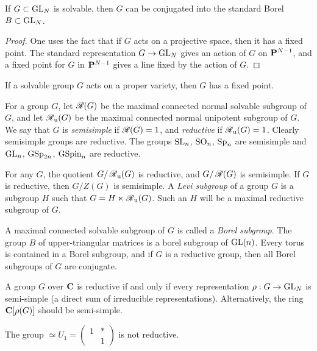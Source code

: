 \begin{theo}
If $G\subset \operatorname{GL}_N$ is solvable, then $G$ can be conjugated 
into the standard Borel $B\subset \operatorname{GL}_N$. 
\end{theo}
\begin{proof}
One uses the fact that if $G$ acts on a projective space, then it has a fixed 
point. The standard representation $G\to \operatorname{GL}_N$ gives an action of 
$G$ on $\mathbf{P}^{N-1}$, and a fixed point for $G$ in $\mathbf{P}^{N-1}$ gives a line fixed 
by the action of $G$. 
\end{proof}

\begin{theo}[Borel]
If a solvable group $G$ acts on a proper variety, then $G$ has a fixed point. 
\end{theo}

For a group $G$, let $\operatorname{\mathscr{R}}(G)$ be the maximal connected normal solvable 
subgroup of $G$, and let $\operatorname{\mathscr{R}}_{\mathrm{u}}(G)$ be the maximal connected normal 
unipotent subgroup of $G$. We say that $G$ is \emph{semisimple} if 
$\operatorname{\mathscr{R}}(G)=1$, and \emph{reductive} if $\operatorname{\mathscr{R}}_{\mathrm{u}}(G)=1$. Clearly 
semisimple groups are reductive. The groups 
$\operatorname{SL}_n$, $\operatorname{SO}_n$, $\operatorname{Sp}_n$ are semisimple 
and $\operatorname{GL}_n$, $\operatorname{GSp}_{2 n}$, $\operatorname{GSpin}_n$ are 
reductive. 

For any $G$, the quotient $G/\operatorname{\mathscr{R}}_{\mathrm{u}}(G)$ is reductive, and 
$G/\operatorname{\mathscr{R}}(G)$ is semisimple. If $G$ is reductive, then $G/Z(G)$ is 
semisimple. A \emph{Levi subgroup} of a group $G$ is a subgroup $H$ such 
that $G=H\ltimes \operatorname{\mathscr{R}}_{\mathrm{u}} (G)$. Such an $H$ will be a maximal 
reductive subgroup of $G$. 

A maximal connected solvable subgroup of $G$ is called a \emph{Borel subgroup}. 
The group $B$ of upper-triangular matrices is a borel subgroup of 
$\operatorname{GL}(n)$. Every torus is contained in a Borel subgroup, and if $G$ 
is a reductive group, then all Borel subgroups of $G$ are conjugate. 

A group $G$ over $\mathbf{C}$ is reductive if and only if every representation 
$\rho:G\to \operatorname{GL}_N$ is semi-simple (a direct sum of irreducible 
representations). Alternatively, the ring $\mathbf{C}[\rho(G)]$ should be semi-simple. 

\begin{example}
The group $\simeq U_1 = \begin{pmatrix} 1 & \ast \\ & 1 \end{pmatrix}$ 
is not reductive. 
\end{example}






